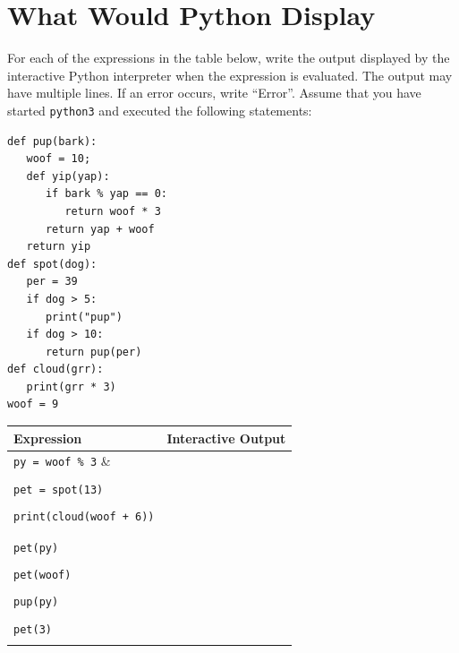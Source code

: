 \documentclass{exam}
\begin{document}
\section{What Would Python Display}
\begin{questions}
\item For each of the expressions in the table below, write the output displayed by the interactive Python interpreter when the expression is evaluated. The output may have multiple lines. If an error occurs, write “Error”.
Assume that you have started \texttt{python3} and executed the following statements:

\begin{lstlisting}
def pup(bark):
   woof = 10;
   def yip(yap):
      if bark % yap == 0:
         return woof * 3
      return yap + woof
   return yip
def spot(dog):
   per = 39
   if dog > 5:
      print("pup")
   if dog > 10:
      return pup(per)
def cloud(grr):
   print(grr * 3)
woof = 9
\end{lstlisting}
\begin{center}
    \begin{tabular}{|m{8cm}|m{6cm}|}
\hline
\textbf{Expression} & \textbf{Interactive Output} \\
\hline
\lstinline$py = woof % 3$ &  \\ & \\
\hline
\lstinline$pet = spot(13)$ & \\ & \\
\hline
\lstinline$print(cloud(woof + 6))$ & \\ & \\ & \\
\hline
\lstinline$pet(py)$ & \\ & \\
\hline
\lstinline$pet(woof)$& \\ & \\
\hline
\lstinline$pup(py)$ & \\ & \\
\hline
\lstinline$pet(3)$ & \\ & \\
\hline
\end{tabular}
\end{center}


\end{questions}
\end{document}
